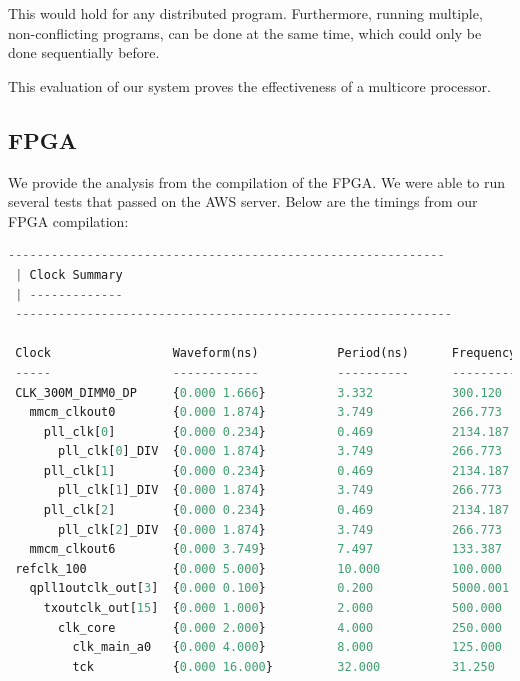 \documentclass{article}
\begin{document}
This would hold for any distributed program. Furthermore, running multiple, non-conflicting programs, can be done at the same time, which could only be done sequentially before.

This evaluation of our system proves the effectiveness of a multicore processor.




\subsection{FPGA}

We provide the analysis from the compilation of the FPGA. We were able to run several tests that passed on the AWS server. 
Below are the timings from our FPGA compilation:
\begin{lstlisting}[language=Python]
 -------------------------------------------------------------
 | Clock Summary
 | -------------
 -------------------------------------------------------------
 
 Clock                 Waveform(ns)           Period(ns)      Frequency(MHz)
 -----                 ------------           ----------      --------------
 CLK_300M_DIMM0_DP     {0.000 1.666}          3.332           300.120         
   mmcm_clkout0        {0.000 1.874}          3.749           266.773         
     pll_clk[0]        {0.000 0.234}          0.469           2134.187        
       pll_clk[0]_DIV  {0.000 1.874}          3.749           266.773         
     pll_clk[1]        {0.000 0.234}          0.469           2134.187        
       pll_clk[1]_DIV  {0.000 1.874}          3.749           266.773         
     pll_clk[2]        {0.000 0.234}          0.469           2134.187        
       pll_clk[2]_DIV  {0.000 1.874}          3.749           266.773         
   mmcm_clkout6        {0.000 3.749}          7.497           133.387         
 refclk_100            {0.000 5.000}          10.000          100.000         
   qpll1outclk_out[3]  {0.000 0.100}          0.200           5000.001        
     txoutclk_out[15]  {0.000 1.000}          2.000           500.000         
       clk_core        {0.000 2.000}          4.000           250.000         
         clk_main_a0   {0.000 4.000}          8.000           125.000         
         tck           {0.000 16.000}         32.000          31.250          
\end{lstlisting}
\end{document}

